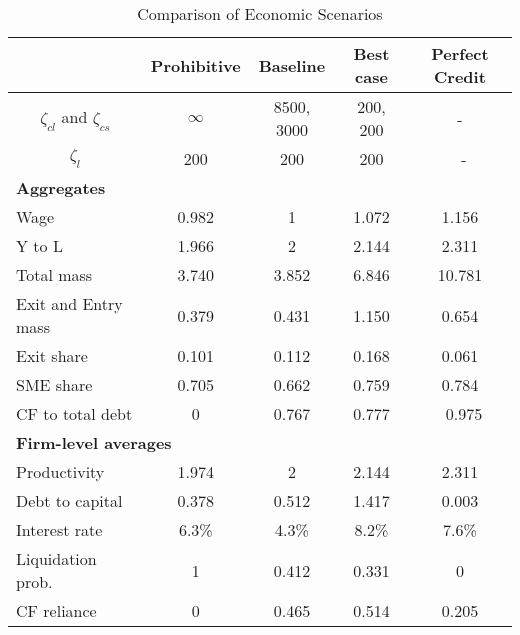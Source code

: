\documentclass[12pt]{article}
\begin{document}
\begin{table}[h!]
    \centering
    \begin{tabular}{lcccc}
    & \textbf{Prohibitive} & \textbf{Baseline} & \textbf{Best case} & \textbf{Perfect Credit} \\
    \toprule
    \multicolumn{1}{c}{$\zeta_{cl}$ and $\zeta_{cs}$} & $\infty$ & 8500, 3000 & 200, 200 & - \\
    \multicolumn{1}{c}{$\zeta_l$} & 200 & 200 & 200 & \ - \vspace{3mm} \\
    \multicolumn{5}{l}{\textbf{Aggregates}} \\ \hline
    Wage & 0.982 & 1 & 1.072 & 1.156 \\
    Y to L & 1.966 & 2 & 2.144 & 2.311 \\
    Total mass & 3.740 & 3.852 & 6.846 & 10.781 \\
    Exit and Entry mass & 0.379 & 0.431 & 1.150 & 0.654 \\
    Exit share & 0.101 & 0.112 & 0.168 & 0.061 \\
    SME share & 0.705 & 0.662 & 0.759 & 0.784 \\
    CF to total debt & 0 & 0.767 & 0.777 &  \ 0.975 \vspace{3mm} \\
    \multicolumn{5}{l}{\textbf{Firm-level averages}} \\ \hline
    Productivity & 1.974 & 2 & 2.144 & 2.311 \\
    Debt to capital & 0.378 & 0.512 & 1.417 & 0.003 \\
    Interest rate & 6.3\% & 4.3\% & 8.2\% & 7.6\% \\
    Liquidation prob. & 1 & 0.412 & 0.331 & 0 \\
    CF reliance & 0 & 0.465 & 0.514 & 0.205 \\
    \bottomrule
    \end{tabular}
    \caption{Comparison of Economic Scenarios}
    \label{tab:SSvalues}
\end{table}
\end{document}
